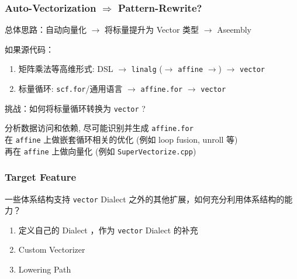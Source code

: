 \documentclass[aspectratio=169]{ctexbeamer}
\begin{document}
\begin{frame}
    \frametitle{Auto-Vectorization $\Rightarrow$ Pattern-Rewrite?}

    总体思路：自动向量化 $\rightarrow$ 将标量提升为 Vector 类型 $\rightarrow$ Aseembly

    \hspace{2em}

    如果源代码：
    \begin{enumerate}
        \item 矩阵乘法等高维形式: DSL $\rightarrow$ \texttt{linalg} ($\rightarrow$ \texttt{affine} $\rightarrow$) $\rightarrow$ \texttt{vector}
        \item 标量循环: \texttt{scf.for}/通用语言 $\rightarrow$ \texttt{affine.for} $\rightarrow$ \texttt{vector}
    \end{enumerate}

    \begin{center}
        挑战：如何将标量循环转换为 \texttt{vector} ?

        \vspace{1.5em}
        分析数据访问和依赖, 尽可能识别并生成 \texttt{affine.for} \\
        在 \texttt{affine} 上做嵌套循环相关的优化 (例如 loop fusion, unroll 等) \\
        再在 \texttt{affine} 上做向量化 (例如 \texttt{SuperVectorize.cpp})
    \end{center}

\end{frame}

\begin{frame}
    \frametitle{Target Feature}

    一些体系结构支持 \texttt{vector} Dialect 之外的其他扩展，如何充分利用体系结构的能力？

    \vspace{1.5em}

    \begin{enumerate}
        \item 定义自己的 Dialect ，作为 \texttt{vector} Dialect 的补充
        \item Custom Vectorizer
        \item Lowering Path
    \end{enumerate}

\end{frame}
\end{document}
